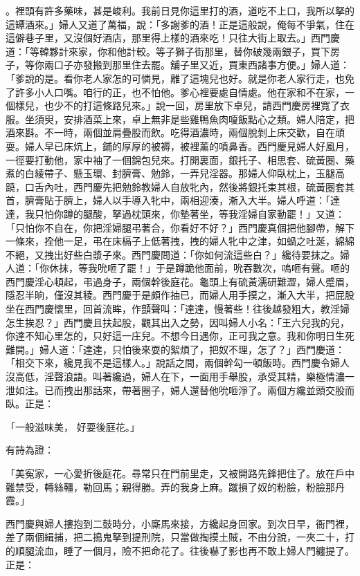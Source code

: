 。裡頭有許多藥味，甚是峻利。我前日見你這里打的酒，道吃不上口，我所以拏的這罈酒來。」婦人又道了萬福，說：「多謝爹的酒！正是這般說，俺每不爭氣，住在這僻巷子里，又沒個好酒店，那里得上樣的酒來吃！只往大街上取去。」西門慶道：「等韓夥計來家，你和他計較。等子獅子街那里，替你破幾兩銀子，買下房子，等你兩口子亦發搬到那里住去罷。舖子里又近，買東西諸事方便。」婦人道：「爹說的是。看你老人家怎的可憐見，離了這塊兒也好。就是你老人家行走，也免了許多小人口嘴。咱行的正，也不怕他。爹心裡要處自情處。他在家和不在家，一個樣兒，也少不的打這條路兒來。」說一回，房里放下卓兒，請西門慶房裡寬了衣服。坐須臾，安排酒菜上來，卓上無非是些雞鴨魚肉嗄飯點心之類。婦人陪定，把酒來斟。不一時，兩個並肩疊股而飲。吃得酒濃時，兩個脫剝上床交歡，自在頑耍。婦人早已床炕上，鋪的厚厚的被褥，被裡薰的噴鼻香。西門慶見婦人好風月，一徑要打動他，家中袖了一個錦包兒來。打開裏面，銀托子、相思套、硫黃圈、藥煮的白綾帶子、懸玉環、封臍膏、勉鈴，一弄兒淫器。那婦人仰臥枕上，玉腿高蹺，口舌內吐，西門慶先把勉鈴教婦人自放牝內，然後將銀托束其根，硫黃圈套其首，臍膏貼于臍上，婦人以手導入牝中，兩相迎湊，漸入大半。婦人呼道：「達達，我只怕你蹲的腿酸，拏過枕頭來，你墊著坐，等我淫婦自家動罷！」又道：「只怕你不自在，你把淫婦腿弔著合，你看好不好？」西門慶真個把他腳帶，解下一條來，拴他一足，弔在床槅子上低著拽，拽的婦人牝中之津，如蝸之吐涎，綿綿不絕，又拽出好些白漿子來。西門慶問道：「你如何流這些白？」纔待要抹之。婦人道：「你休抹，等我吮咂了罷！」于是蹲跪他面前，吮吞數次，嗚咂有聲。咂的西門慶淫心頓起，弔過身子，兩個幹後庭花。龜頭上有硫黃濡研難澀，婦人蹙眉，隱忍半晌，僅沒其稜。西門慶于是頗作抽已，而婦人用手摸之，漸入大半，把屁股坐在西門慶懷里，回首流眸，作顫聲叫：「達達，慢著些！往後越發粗大，教淫婦怎生挨忍？」西門慶且扶起股，觀其出入之勢，因叫婦人小名：「王六兒我的兒，你達不知心里怎的，只好這一庄兒。不想今日遇你，正可我之意。我和你明日生死難開。」婦人道：「達達，只怕後來耍的絮煩了，把奴不理，怎了？」西門慶道：「相交下來，纔見我不是這樣人。」說話之間，兩個幹勾一頓飯時。西門慶令婦人沒高低，淫聲浪語。叫著纔過，婦人在下，一面用手舉股，承受其精，樂極情濃一泄如注。已而拽出那話來，帶著圈子，婦人還替他吮咂淨了。兩個方纔並頭交股而臥。正是：

「一般滋味美，  好耍後庭花。」

有詩為證：

「美寃家，一心愛折後庭花。尋常只在門前里走，又被開路先鋒把住了。放在戶中難禁受，轉絲韁，勒回馬；親得勝。弄的我身上麻。蹴損了奴的粉臉，粉臉那丹霞。」

西門慶與婦人摟抱到二鼓時分，小廝馬來接，方纔起身回家。到次日早，衙門裡，差了兩個緝捕，把二搗鬼拏到提刑院，只當做掏摸土賊，不由分說，一夾二十，打的順腿流血，睡了一個月，險不把命花了。往後嚇了影也再不敢上婦人門纏提了。正是：

